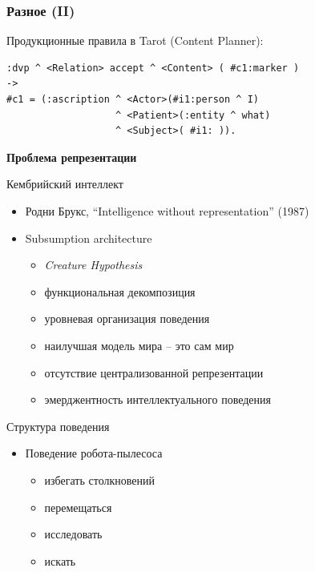 \documentclass{beamer}
\begin{document}
\begin{frame}[fragile]
\frametitle{Разное (II)}
Продукционные правила в Tarot (Content Planner):\\
\bigskip
{\footnotesize \begin{verbatim}
:dvp ^ <Relation> accept ^ <Content> ( #c1:marker )
->
#c1 = (:ascription ^ <Actor>(#i1:person ^ I)
                   ^ <Patient>(:entity ^ what)
                   ^ <Subject>( #i1: )).
\end{verbatim}}
\end{frame}

%
%

\begin{frame}{}
\begin{center}
	\textbf{Проблема репрезентации}
\end{center}
\end{frame}

\begin{frame}{Кембрийский интеллект}
\begin{itemize}
	\item Родни Брукс, ``Intelligence without representation'' (1987)
	\bigskip
	\item Subsumption architecture
	    \medskip
    	\begin{itemize}
	        \item \textit{Creature Hypothesis}
	        \medskip
    	    \item функциональная декомпозиция	        
	        \medskip
	        \item уровневая организация поведения
    	    \medskip
    	    \item наилучшая модель мира -- это сам мир
	        \medskip
	        \item отсутствие централизованной репрезентации
	        \medskip
	        \item эмерджентность интеллектуального поведения
    	\end{itemize}	
\end{itemize}
\end{frame}

\begin{frame}{Структура поведения}
\begin{itemize}
	\item Поведение робота-пылесоса
	\bigskip
	\begin{itemize}
	    \item избегать столкновений
	    \medskip
	    \item перемещаться
	    \medskip
	    \item исследовать
	    \medskip
	    \item искать
	\end{itemize}
\end{itemize}
\end{frame}
\end{document}
